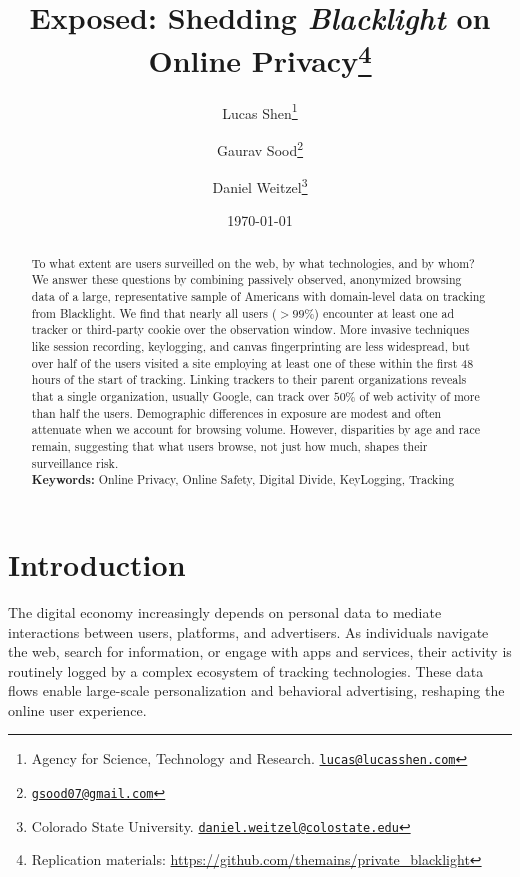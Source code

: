 \documentclass[12pt, letterpaper]{article}
\title{Exposed: Shedding \textit{Blacklight} on Online Privacy\thanks{Replication materials: \url{https://github.com/themains/private_blacklight}}}
\author{
    Lucas Shen\thanks{Agency for Science, Technology and Research. \href{mailto:lucas@lucasshen.com}{\texttt{lucas@lucasshen.com}}}
    \and
    Gaurav Sood\thanks{\href{mailto:gsood07@gmail.com}{\texttt{gsood07@gmail.com}}}
    \and
    Daniel Weitzel\thanks{Colorado State University. \href{mailto:daniel.weitzel@colostate.edu}{\texttt{daniel.weitzel@colostate.edu}}}
}
\date{\today}
\begin{document}
\maketitle
\onehalfspacing
\begin{abstract}

To what extent are users surveilled on the web, by what technologies, and by whom? We answer these questions by combining passively observed, anonymized browsing data of a large, representative sample of Americans with domain-level data on tracking from Blacklight. We find that nearly all users ($ > 99\%$) encounter at least one ad tracker or third-party cookie over the observation window. More invasive techniques like session recording, keylogging, and canvas fingerprinting are less widespread, but over half of the users visited a site employing at least one of these within the first 48 hours of the start of tracking. Linking trackers to their parent organizations reveals that a single organization, usually Google, can track over $50\%$ of web activity of more than half the users. Demographic differences in exposure are modest and often attenuate when we account for browsing volume. However, disparities by age and race remain, suggesting that what users browse, not just how much, shapes their surveillance risk.\\
    \noindent
	\textbf{Keywords:} Online Privacy, Online Safety, Digital Divide, KeyLogging, Tracking\\

        
\end{abstract}
\vspace{1cm}
\thispagestyle{empty}
\newpage
\setcounter{page}{1}
\newpage


\doublespacing
\section{Introduction}

The digital economy increasingly depends on personal data to mediate interactions between users, platforms, and advertisers. As individuals navigate the web, search for information, or engage with apps and services, their activity is routinely logged by a complex ecosystem of tracking technologies. These data flows enable large-scale personalization and behavioral advertising,  reshaping the online user experience.
\end{document}
